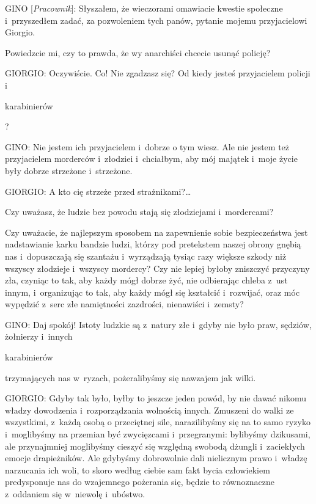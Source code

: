 \documentclass[oneside,polish,11pt,sfheadings]{mwbk}
\begin{document}
 
GINO [\textit{Pracownik}]: Słyszałem, że wieczorami omawiacie kwestie społeczne i~przyszedłem zadać, za
pozwoleniem tych panów, pytanie mojemu przyjacielowi Giorgio. 

 
Powiedzcie mi, czy to prawda, że wy anarchiści chcecie usunąć policję? 




 
\noindent GIORGIO: Oczywiście. Co! Nie zgadzasz się? Od kiedy jesteś przyjacielem policji i~\begin{itshape}karabinierów \end{itshape}? 




 
\noindent \noindent GINO: Nie jestem ich przyjacielem i~dobrze o tym wiesz. Ale nie jestem też przyjacielem morderców i~złodziei i~chciałbym, aby mój majątek i~moje życie były dobrze strzeżone i~strzeżone. 




 
\noindent GIORGIO: A kto cię strzeże przed strażnikami?\ldots 

 
Czy uważasz, że ludzie bez powodu stają się złodziejami i~mordercami? 

 
Czy uważacie, że najlepszym sposobem na zapewnienie sobie bezpieczeństwa jest nadstawianie karku bandzie ludzi, którzy
pod pretekstem naszej obrony gnębią nas i~dopuszczają się szantażu i~wyrządzają tysiąc razy większe szkody niż wszyscy
złodzieje i~wszyscy mordercy? Czy nie lepiej byłoby zniszczyć przyczyny zła, czyniąc to tak, aby każdy mógł dobrze żyć,
nie odbierając chleba z~ust innym, i~organizując to tak, aby każdy mógł się kształcić i~rozwijać, oraz móc wypędzić z~serc złe namiętności zazdrości, nienawiści i~zemsty? 




 
\noindent \noindent GINO: Daj spokój! Istoty ludzkie są z~natury złe i~gdyby nie było praw, sędziów, żołnierzy i~innych
\begin{itshape}karabinierów \end{itshape} trzymających nas w~ryzach, pożeralibyśmy się
nawzajem jak wilki. 




 
\noindent GIORGIO: Gdyby tak było, byłby to jeszcze jeden powód, by nie dawać nikomu władzy dowodzenia i~rozporządzania wolnością
innych. Zmuszeni do walki ze wszystkimi, z~każdą osobą o przeciętnej sile, narazilibyśmy się na to samo ryzyko i~moglibyśmy na przemian być zwycięzcami i~przegranymi: bylibyśmy dzikusami, ale przynajmniej moglibyśmy cieszyć się
względną swobodą dżungli i~zaciekłych emocje drapieżników. Ale gdybyśmy dobrowolnie dali nielicznym prawo i~władzę
narzucania ich woli, to skoro według ciebie sam fakt bycia człowiekiem predysponuje nas do wzajemnego pożerania się,
będzie to równoznaczne z~oddaniem się w~niewolę i~ubóstwo. 
\end{document}
